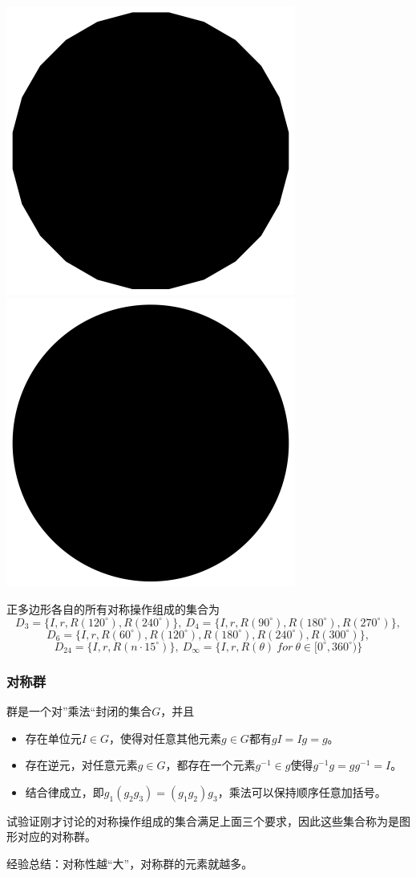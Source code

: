 \documentclass[CJK]{beamer}
\begin{document}
\begin{frame}
\begin{center}
\includegraphics[scale=0.15]{pol24}
\includegraphics[scale=0.15]{cir}
\end{center}
正多边形各自的所有对称操作组成的集合为
$$D_3 = \{I,r,R(120^\circ),R(240^\circ)\},\ D_4 = \{I,r,R(90^\circ),R(180^\circ),R(270^\circ)\},$$
$$D_6 = \{I,r,R(60^\circ),R(120^\circ),R(180^\circ),R(240^\circ),R(300^\circ)\},$$
$$D_{24} = \{I,r,R(n\cdot 15^\circ)\},\ D_\infty = \{I,r,R(\theta) \ for \ \theta \in [0^\circ, 360^\circ)\}$$


\ech
\end{frame}

\begin{frame}
\frametitle{\bch 对称群 \ech}
\bch
群是一个对”乘法“封闭的集合$G$，并且
\begin{itemize}
\item 存在单位元$I \in G$，使得对任意其他元素$g \in G$都有$gI = Ig = g$。
\item 存在逆元，对任意元素$g \in G$，都存在一个元素$g^{-1}\in g$使得$g^{-1} g = gg^{-1} = I$。
\item 结合律成立，即$g_1 ( g_2 g_3) = (g_1 g_2) g_3$，乘法可以保持顺序任意加括号。
\end{itemize}
试验证刚才讨论的对称操作组成的集合满足上面三个要求，因此这些集合称为是图形对应的对称群。 
\par
经验总结：对称性越“大”，对称群的元素就越多。

\ech
\end{frame}
\end{document}

